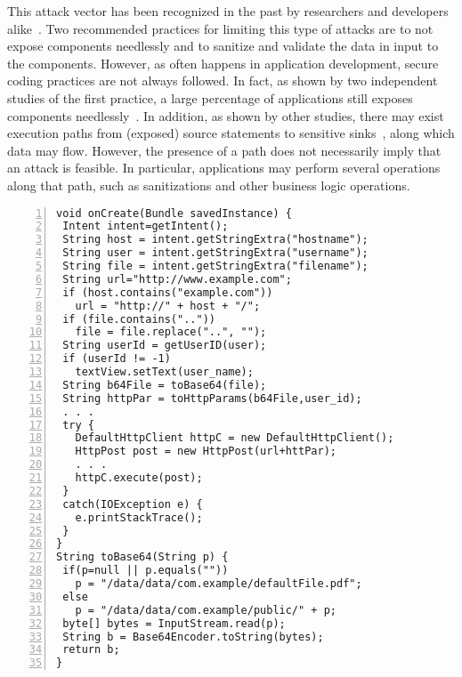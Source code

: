 This attack vector has been recognized in the past by researchers and developers alike~\cite{Lu:CHEX:2012,chin2011analyzing,AppIntent,IntentsForDevelopers}. Two recommended practices for limiting this type of attacks are to not expose components needlessly and to sanitize and validate the data in input to the components. However, as often happens in application development, secure coding practices are not always followed. In fact, as shown by two independent studies of the first practice, a large percentage of applications still exposes components needlessly~\cite{Epicc,chin2011analyzing}. In addition, as shown by other studies, there may exist execution paths from (exposed) source statements to sensitive sinks~\cite{Lu:CHEX:2012}, along which data may flow. However, the presence of a path does not necessarily imply that an attack is feasible. In particular, applications may perform several operations along that path, such as sanitizations and other business logic operations. 

\begin{lstlisting}[caption={Source code of a vulnerable application},label={lst:example},numbers=left,xleftmargin=1cm,basicstyle=\ttfamily\scriptsize ]
void onCreate(Bundle savedInstance) {
 Intent intent=getIntent();
 String host = intent.getStringExtra("hostname");
 String user = intent.getStringExtra("username");
 String file = intent.getStringExtra("filename");
 String url="http://www.example.com";
 if (host.contains("example.com"))
   url = "http://" + host + "/";
 if (file.contains(".."))
   file = file.replace("..", "");
 String userId = getUserID(user);
 if (userId != -1)
   textView.setText(user_name);
 String b64File = toBase64(file);
 String httpPar = toHttpParams(b64File,user_id);
 . . .
 try {
   DefaultHttpClient httpC = new DefaultHttpClient();
   HttpPost post = new HttpPost(url+httPar);
   . . .
   httpC.execute(post);
 }
 catch(IOException e) {
   e.printStackTrace();
 }
}
String toBase64(String p) {
 if(p=null || p.equals(""))
   p = "/data/data/com.example/defaultFile.pdf";
 else
   p = "/data/data/com.example/public/" + p;
 byte[] bytes = InputStream.read(p);
 String b = Base64Encoder.toString(bytes);
 return b;
}
\end{lstlisting}

